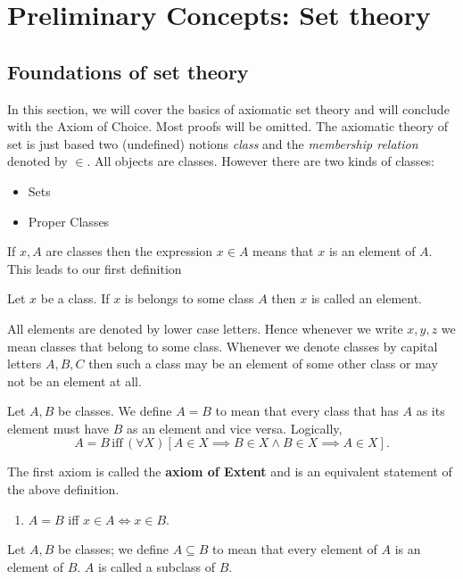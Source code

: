 \chapter{Preliminary Concepts: Set theory}
\section{Foundations of set theory}
In this section, we will cover the basics of axiomatic set theory and will conclude with the 
Axiom of Choice. Most proofs will be omitted.
The axiomatic theory of set is just based two (undefined) notions \textit{class} and the 
\textit{membership relation} denoted by $\in$. All objects are classes. However there are two kinds
of classes:
\begin{itemize}
    \item Sets
    \item Proper Classes
\end{itemize}
If $x,A$ are classes then the expression $x \in A$ means that $x$ is an element of $A$. This leads
to our first definition
\begin{Definition}
    Let $x$ be a class. If $x$ is belongs to some class $A$ then $x$ is called an element.
\end{Definition}
All elements are denoted by lower case letters. Hence whenever we write $x,y,z$ we mean classes that
belong to some class. Whenever we denote classes by capital letters $A,B,C$ then such a class may be
an element of some other class or may not be an element at all.

\begin{Definition}
    Let $A,B$ be classes. We define $A = B$ to mean that every class that has $A$ as its element
    must have $B$ as an element and vice versa. Logically,
    \begin{equation*}
	A = B \, \text{iff} \, (\forall X)\left[ A \in X \implies B \in X \land B \in X \implies A \in X
	\right].
    \end{equation*}
\end{Definition}

The first axiom is called the \textbf{axiom of Extent} and is an equivalent statement of the above
definition.
\begin{enumerate}[label=\bfseries Axiom 1:]
    \item $A = B$ iff $x \in A \iff x \in B$.  
\end{enumerate}

\begin{Definition}
    Let $A,B$ be classes; we define $A \subseteq B$ to mean that every element of $A$ is an element of
    $B$. $A$ is called a subclass of $B$.
\end{Definition}

